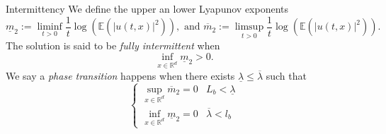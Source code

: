 \documentclass{beamer}%
\numberwithin{equation}{section}
\newcommand{\R}{\mathbb{R}}
\begin{document}
\begin{frame}{Intermittency}
	We define the upper an lower Lyapunov exponents 
	\[
	\underline{m}_2 := \liminf_{t>0} \frac{1}{t} \log\left(\mathbb{E}(|u(t,x)|^2) \right), \text{ and } \overline{m}_2 := \limsup_{t>0} \frac{1}{t} \log\left(\mathbb{E}(|u(t,x)|^2)\right).
	\]
	The solution is said to be {\it fully intermittent} when 
	\[
	\inf_{x\in\R^d} \underline{m}_2 > 0.
	\]
	We say a {\it phase transition} happens when there exists $\underline{\lambda} \le \overline\lambda$ such that 
	\[
	\begin{cases}
	\sup_{x \in \R^d} \overline{m}_2 = 0 & L_b < \underline{\lambda} \\
	\inf_{x \in \R^d} \underline{m}_2 = 0 &  \overline{\lambda} < l_b  
	\end{cases}
	\]
\end{frame}
\end{document}
